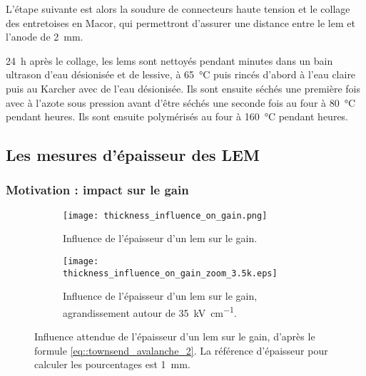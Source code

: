             L'étape suivante est alors la soudure de connecteurs haute tension et le collage des entretoises en Macor, qui permettront d'assurer une distance entre le \gls{lem} et l'anode de \SI{2}{\milli\meter}.
            
            \SI{24}{\hour} après le collage, les \glspl{lem} sont nettoyés pendant  minutes dans un bain ultrason d'eau désionisée et de lessive, à \SI{65}{\celsius} puis rincés d'abord à l'eau claire puis au Karcher avec de l'eau désionisée. Ils sont ensuite séchés une première fois avec à l'azote sous pression avant d'être séchés une seconde fois au four à \SI{80}{\celsius} pendant  heures. Ils sont ensuite polymérisés au four à \SI{160}{\celsius} pendant  heures.
        
        \subsection{Les mesures d’épaisseur des LEM}\label{sec::epaisseur}
        
            \subsubsection{Motivation : impact sur le gain}
            
                \begin{figure}[htbp]
                    \begin{subfigure}[t]{0.48\textwidth}
                        \texttt{[image: thickness\_influence\_on\_gain.png]}
                        \caption{Influence de l'épaisseur d'un \gls{lem} sur le gain.}
                    \end{subfigure}
                    \hfill
                    \begin{subfigure}[t]{0.48\textwidth}
                        \texttt{[image: thickness\_influence\_on\_gain\_zoom\_3.5k.eps]}
                        \caption{Influence de l'épaisseur d'un \gls{lem} sur le gain, agrandissement autour de \SI{35}{\kilo\volt\per\centi\meter}.}
                    \end{subfigure}
                    \caption[Influence de l'épaisseur d'un \gls{lem} sur le gain.]{Influence attendue de l'épaisseur d'un \gls{lem} sur le gain, d'après le formule \eqref{eq::townsend_avalanche_2}. La référence d'épaisseur pour calculer les pourcentages est \SI{1}{\milli\meter}.}
                    \label{fig::thickness_influence_on_gain}
                \end{figure}
            
